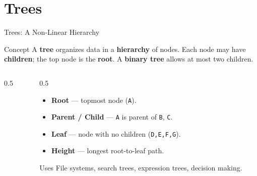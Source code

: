 \documentclass[aspectratio=169]{beamer}
\begin{document}
	\section{Trees}
	\begin{frame}{Trees: A Non-Linear Hierarchy}
		\begin{block}{Concept}
			A \textbf{tree} organizes data in a \textbf{hierarchy} of nodes. Each node may have
			\textbf{children}; the top node is the \textbf{root}. A \textbf{binary tree} allows at most two children.
		\end{block}
		\begin{columns}[T]
			\begin{column}{0.5\textwidth}
				\centering
			\end{column}
			\begin{column}{0.5\textwidth}
				\begin{itemize}\small
					\item \textbf{Root} --- topmost node (\texttt{A}).
					\item \textbf{Parent / Child} --- \texttt{A} is parent of \texttt{B}, \texttt{C}.
					\item \textbf{Leaf} --- node with no children (\texttt{D,E,F,G}).
					\item \textbf{Height} --- longest root-to-leaf path.
				\end{itemize}
				\begin{block}{Uses}
					\small File systems, search trees, expression trees, decision making.
				\end{block}
			\end{column}
		\end{columns}
	\end{frame}
\end{document}
